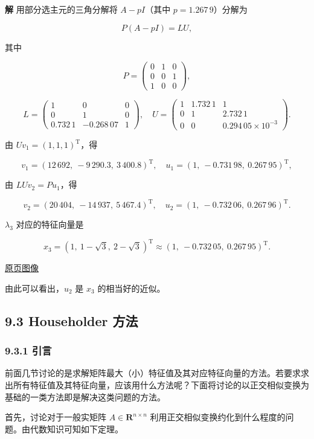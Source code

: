 \documentclass[
  10pt,
  fontset=fandol]{ctexart}
\begin{document}
\textbf{解} 用部分选主元的三角分解将 \(A-pI\)（其中 \(p=1.267\,9\)）分解为

\[
P(A-pI)=LU,
\]

其中

\[
P=\begin{pmatrix}
0&1&0\\
0&0&1\\
1&0&0
\end{pmatrix},
\]

\[
L=\begin{pmatrix}
1&0&0\\
0&1&0\\
0.732\,1&-0.268\,07&1
\end{pmatrix},\quad
U=\begin{pmatrix}
1&1.732\,1&1\\
0&1&2.732\,1\\
0&0&0.294\,05\times10^{-3}
\end{pmatrix}.
\]

由 \(Uv_1=(1,1,1)^{\mathrm T}\)，得

\[
v_1=(12\,692,\ -9\,290.3,\ 3\,400.8)^{\mathrm T},\quad
u_1=(1,\ -0.731\,98,\ 0.267\,95)^{\mathrm T},
\]

由 \(LUv_2=Pu_1\)，得

\[
v_2=(20\,404,\ -14\,937,\ 5\,467.4)^{\mathrm T},\quad
u_2=(1,\ -0.732\,06,\ 0.267\,96)^{\mathrm T}.
\]

\(\lambda_3\) 对应的特征向量是

\[
x_3=(1,\ 1-\sqrt3,\ 2-\sqrt3)^{\mathrm T}\approx(1,\ -0.732\,05,\ 0.267\,95)^{\mathrm T}.
\]

\href{../../source-images/pdf-243.jpeg}{原页图像}

由此可以看出，\(u_2\) 是 \(x_3\) 的相当好的近似。

\subsection{9.3 Householder 方法}\label{householder-ux65b9ux6cd5}

\subsubsection{9.3.1 引言}\label{ux5f15ux8a00-1}

前面几节讨论的是求解矩阵最大（小）特征值及其对应特征向量的方法。若要求求出所有特征值及其特征向量，应该用什么方法呢？下面将讨论的以正交相似变换为基础的一类方法即是解决这类问题的方法。

首先，讨论对于一般实矩阵 \(A\in\mathbf R^{n\times n}\) 利用正交相似变换约化到什么程度的问题。由代数知识可知如下定理。
\end{document}
